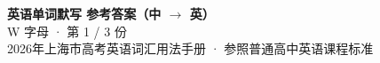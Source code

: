 \documentclass[10pt,a4paper]{article}
\begin{document}
\pagestyle{plain}

\begin{center}
{\LARGE\bfseries 英语单词默写 \quad 参考答案（中 $\to$ 英）}\\[0.22em]
{\large W 字母 · 第 1 / 3 份}\\[0.18em]
{\small 2026年上海市高考英语词汇用法手册 · 参照普通高中英语课程标准}
\end{center}

\vspace{0.2em}
\noindent{\color{rulegray}\rule{\textwidth}{0.8pt}}

\vspace{0.35em}

\vspace{0.25em}
\renewcommand{\arraystretch}{1.32}
\end{document}
